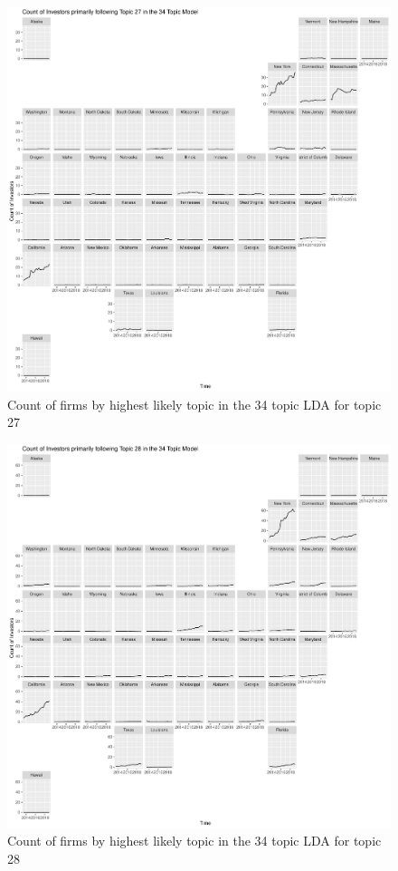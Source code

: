 \begin{figure}
	\centering
	\includegraphics[width=1\linewidth]{Figures/ChapterV/USA_34_Topic27.pdf}
	\caption[Count of Firms for Topic 27 by Quarter]{Count of firms by highest likely topic in the 34 topic LDA for topic 27}
	\label{fig:StateLDA27}
\end{figure}

\begin{figure}
	\centering
	\includegraphics[width=1\linewidth]{Figures/ChapterV/USA_34_Topic28.pdf}
	\caption[Count of Firms for Topic 28 by Quarter]{Count of firms by highest likely topic in the 34 topic LDA for topic 28}
	\label{fig:StateLDA28}
\end{figure}

